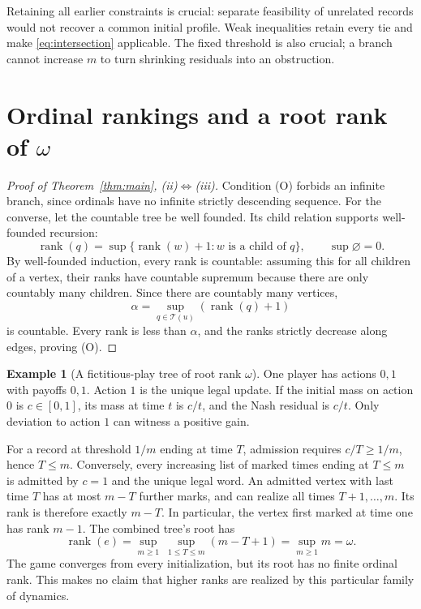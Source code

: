 \documentclass[11pt,a4paper]{article}
\theoremstyle{definition}
\newtheorem{example}[theorem]{Example}
\DeclareMathOperator{\rank}{rank}
\begin{document}
Retaining all earlier constraints is crucial: separate feasibility of
unrelated records would not recover a common initial profile. Weak
inequalities retain every tie and make \eqref{eq:intersection} applicable.
The fixed threshold is also crucial; a branch cannot increase $m$ to
turn shrinking residuals into an obstruction.

\section{Ordinal rankings and a root rank of \texorpdfstring{$\omega$}{omega}}

\begin{proof}[Proof of Theorem~\ref{thm:main}, \textup{(ii)}$\Leftrightarrow$\textup{(iii)}]
Condition (O) forbids an infinite branch, since ordinals have no infinite
strictly descending sequence. For the converse, let the countable tree be
well founded. Its child relation supports well-founded recursion:
\begin{equation}\label{eq:rank}
 \rank(q)=\sup\{\rank(w)+1:w\text{ is a child of }q\},
 \qquad\sup\varnothing=0.
\end{equation}
By well-founded induction, every rank is countable: assuming this for all
children of a vertex, their ranks have countable supremum because there
are only countably many children. Since there are countably many vertices,
\[
 \alpha=\sup_{q\in\mathcal T(u)}(\rank(q)+1)
\]
is countable. Every rank is less than $\alpha$, and the ranks strictly
decrease along edges, proving (O).

\end{proof}

\begin{example}[A fictitious-play tree of root rank $\omega$]
One player has actions $0,1$ with payoffs $0,1$. Action $1$ is the unique
legal update. If the initial mass on action $0$ is $c\in[0,1]$, its mass
at time $t$ is $c/t$, and the Nash residual is $c/t$. Only deviation to
action $1$ can witness a positive gain.

For a record at threshold $1/m$ ending at time $T$, admission requires
$c/T\ge1/m$, hence $T\le m$. Conversely, every increasing list of marked
times ending at $T\le m$ is admitted by $c=1$ and the unique legal word.
An admitted vertex with last time $T$ has at most $m-T$ further marks,
and can realize all times $T+1,\ldots,m$. Its rank is therefore exactly
$m-T$. In particular, the vertex first marked at time one has rank $m-1$.
The combined tree's root has
\[
 \rank(e)=\sup_{m\ge1}\ \sup_{1\le T\le m}(m-T+1)
 =\sup_{m\ge1}m=\omega.
\]
The game converges from every initialization, but its root has no finite
ordinal rank. This makes no claim that higher ranks are realized by this
particular family of dynamics.
\end{example}
\end{document}

